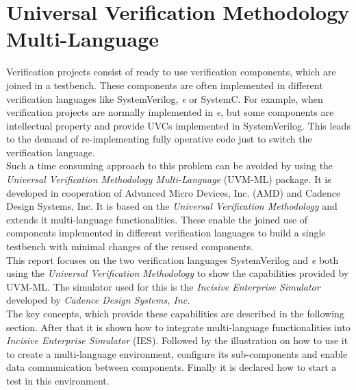 \section{Universal Verification Methodology Multi-Language}\label{uvm_ml}
Verification projects consist of ready to use verification components, which are joined in a testbench. These components
are often implemented in different verification languages like SystemVerilog, \textit{e} or SystemC. For
example, when verification projects are normally implemented in \textit{e}, but some components are intellectual
property and provide UVCs implemented in SystemVerilog. This leads to the demand of re-implementing fully
operative code just to switch the verification language.\\
Such a time consuming approach to this problem can be avoided by using the \emph{Universal Verification Methodology
Multi-Language} (UVM-ML) \cite{uvm_ml_user} package. It is developed in cooperation of Advanced Micro Devices, Inc. (AMD) and Cadence Design
Systems, Inc. It is based on the \emph{Universal Verification Methodology} and extends it multi-language
functionalities. These enable the joined use of components implemented in different verification languages to build a
single testbench with minimal changes of the reused components.\\
This report focuses on the two verification languages SystemVerilog and \textit{e} both using the \emph{Universal
Verification Methodology} to show the capabilities provided by UVM-ML. The simulator used for this is the
\emph{Incisive Enterprise Simulator} developed by \emph{Cadence Design Systems, Inc.}\\
The key concepts, which provide these capabilities are described in the following section. After that it is shown how to
integrate multi-language functionalities into \emph{Incisive Enterprise Simulator} (IES). Followed by the illustration on how
to use it to create a multi-language environment, configure its sub-components and enable data communication between
components. Finally it is declared how to start a test in this environment.












